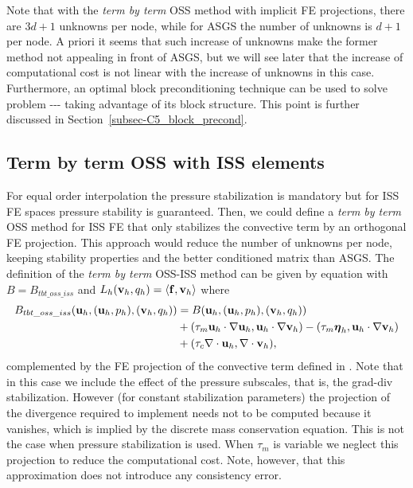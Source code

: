 Note that with the \textit{term by term} OSS method with implicit FE projections, there are $3d+1$ unknowns per node, while for ASGS the number of unknowns is $d+1$ per node. A priori it seems that such increase of unknowns make the former method not appealing in front of ASGS, but we will see later that the increase of computational cost is not linear with the increase of unknowns in this case. Furthermore, an optimal block preconditioning technique can be used to solve problem --- taking advantage of its block structure. This point is further discussed in Section~\ref{subsec-C5_block_precond}.

\subsection{Term by term OSS with ISS elements}
\label{subsec-C5_OSSiss}

For equal order interpolation the pressure stabilization is mandatory but for ISS FE spaces pressure stability is guaranteed. Then, we could define a \textit{term by term} OSS method for ISS FE that only stabilizes the convective term by an orthogonal FE projection.
This approach would reduce the number of unknowns per node, keeping stability properties and the better conditioned matrix than ASGS. The definition of the \textit{term by term} OSS-ISS method can be given by equation  with $B=B_{tbt\_oss\_iss}$ and $L_h({\bf v}_h,q_h)=\left<{\bf f},{\bf v}_h\right>$  where
\begin{align}
\label{eq-C5_biliniar_oss_tbt_iss}
B_{tbt\_oss\_iss}({\bf u}_h,({\bf u}_h,p_h),({\bf v}_h,q_h))&=B({\bf u}_h,({\bf u}_h,p_h),({\bf v}_h,q_h))\\\nonumber
&+(\tau_m{\bf u}_h\cdot\nabla{\bf u}_h,{\bf u}_h\cdot\nabla{\bf v}_h)-(\tau_m\boldsymbol{\eta}_h,{\bf u}_h\cdot\nabla{\bf v}_h)\\\nonumber
&+(\tau_c\nabla\cdot{\bf u}_h,\nabla\cdot{\bf v}_h),
\end{align}
complemented by the FE projection of the convective term defined in . Note that in this case we include the effect of the pressure subscales, that is, the grad-div stabilization. However (for constant stabilization parameters) the projection of the divergence required to implement  needs not to be computed because it vanishes, which is implied by the discrete mass conservation equation. This is not the case when pressure stabilization is used. When $\tau_m$ is variable we neglect this projection to reduce the computational cost. Note, however, that this approximation does not introduce any consistency error.

